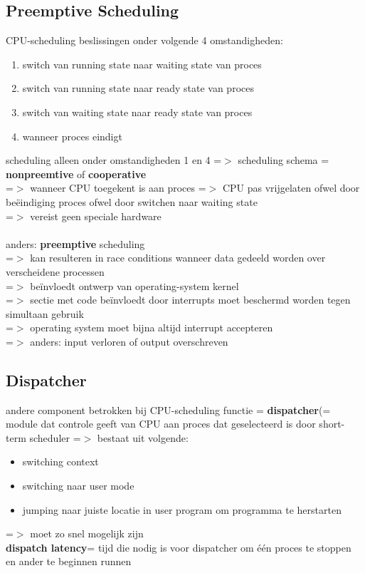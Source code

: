 \documentclass{report}
\begin{document}
\subsection{Preemptive Scheduling}
CPU-scheduling beslissingen onder volgende 4 omstandigheden:
\begin{enumerate}
\item switch van running state naar waiting state van proces
\item switch van running state naar ready state van proces
\item switch van waiting state naar ready state van proces
\item wanneer proces eindigt
\end{enumerate}
scheduling alleen onder omstandigheden 1 en 4 =$>$ scheduling schema = \textbf{nonpreemtive} of \textbf{cooperative}
\\=$>$ wanneer CPU toegekent is aan proces =$>$ CPU pas vrijgelaten ofwel door be\"eindiging proces ofwel door switchen naar waiting state
\\=$>$ vereist geen speciale hardware
\\
\\anders: \textbf{preemptive} scheduling
\\=$>$ kan resulteren in race conditions wanneer data gedeeld worden over verscheidene processen
\\=$>$ be\"invloedt ontwerp van operating-system kernel
\\=$>$ sectie met code be\"invloedt door interrupts moet beschermd worden tegen simultaan gebruik
\\=$>$ operating system moet bijna altijd interrupt accepteren
\\=$>$ anders: input verloren of output overschreven

\subsection{Dispatcher}
andere component betrokken bij CPU-scheduling functie = \textbf{dispatcher}(= module dat controle geeft van CPU aan proces dat geselecteerd is door short-term scheduler
=$>$ bestaat uit volgende:
\begin{itemize}
\item switching context
\item switching naar user mode
\item jumping naar juiste locatie in user program om programma te herstarten
\end{itemize}
=$>$ moet zo snel mogelijk zijn
\\\textbf{dispatch latency}= tijd die nodig is voor dispatcher om \'e\'en proces te stoppen en ander te beginnen runnen
\end{document}
